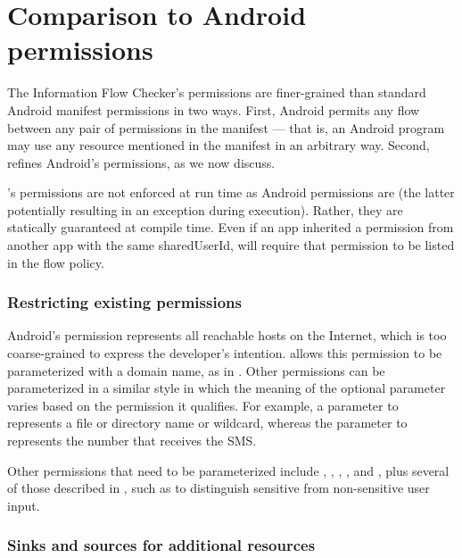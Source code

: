 \section{Comparison to Android permissions}
\label{sec:permissions}


The Information Flow Checker's permissions are finer-grained than standard Android manifest permissions
in two ways.  First, Android permits any flow
between any pair of permissions in the manifest --- that is, an Android
program may use any resource
mentioned in the manifest in an arbitrary way.  Second,
\theFlowChecker refines Android's permissions, as
we now discuss.

\TheFlowChecker's permissions are not enforced at run time as Android
permissions are (the latter potentially resulting in an exception during execution).
Rather, they are statically guaranteed at compile time.  Even if an app
inherited a permission from another app with the same sharedUserId, 
\theFlowChecker will require that permission to be listed in the flow policy.   

\subsubsection{Restricting existing permissions}
\label{sec:parameterized-permissions}

Android's  permission represents all reachable 
hosts on the Internet, which is too coarse-grained to express the
developer's intention.  \TheFlowChecker allows this permission to be parameterized with a domain name,
as in .
Other permissions can be parameterized in a similar style in which 
the meaning of the optional parameter varies based on the permission 
it qualifies.
For example, a parameter to  represents a file or
directory name or wildcard, whereas the 
parameter to  represents the number that receives the
SMS\@.

Other permissions that need to be parameterized include 
, ,
, , and , plus several of those
described in , such as  to
distinguish sensitive from non-sensitive user input.


\subsubsection{Sinks and sources for additional resources}
\label{sec:new-permissions}

